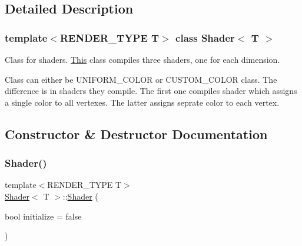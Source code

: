 \subsection{Detailed Description}
\subsubsection*{template$<$R\+E\+N\+D\+E\+R\+\_\+\+T\+Y\+PE T$>$\newline
class Shader$<$ T $>$}

Class for shaders. \mbox{\hyperlink{classThis}{This}} class compiles three shaders, one for each dimension. 

Class can either be U\+N\+I\+F\+O\+R\+M\+\_\+\+C\+O\+L\+OR or C\+U\+S\+T\+O\+M\+\_\+\+C\+O\+L\+OR class. The difference is in shaders they compile. The first one compiles shader which assigns a single color to all vertexes. The latter assigns seprate color to each vertex. 

\subsection{Constructor \& Destructor Documentation}
\mbox{\label{classShader_a2b6e07575dcdc2fda5fbf6996a69345b}} 
\subsubsection{\texorpdfstring{Shader()}{Shader()}\hspace{0.1cm}{\footnotesize\ttfamily [1/8]}}
{\footnotesize\ttfamily template$<$R\+E\+N\+D\+E\+R\+\_\+\+T\+Y\+PE T$>$ \\
\mbox{\hyperlink{classShader}{Shader}}$<$ T $>$\+::\mbox{\hyperlink{classShader}{Shader}} (\begin{DoxyParamCaption}\item[{bool}]{initialize = {\ttfamily false} }\end{DoxyParamCaption})\hspace{0.3cm}{\ttfamily [inline]}}

\mbox{\label{classShader_ae93db4f8280ee456ca13eaa7b9c47ec5}} 
